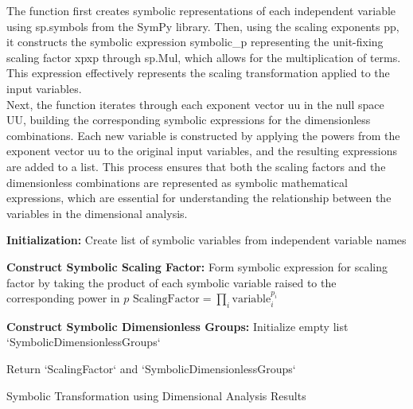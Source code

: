 \documentclass{article}
\begin{document}
The function first creates symbolic representations of each independent variable using sp.symbols from the SymPy library. Then, using the scaling exponents pp, it constructs the symbolic expression symbolic\_p representing the unit-fixing scaling factor xpxp through sp.Mul, which allows for the multiplication of terms. This expression effectively represents the scaling transformation applied to the input variables.\\

Next, the function iterates through each exponent vector uu in the null space UU, building the corresponding symbolic expressions for the dimensionless combinations. Each new variable is constructed by applying the powers from the exponent vector uu to the original input variables, and the resulting expressions are added to a list. This process ensures that both the scaling factors and the dimensionless combinations are represented as symbolic mathematical expressions, which are essential for understanding the relationship between the variables in the dimensional analysis.\\



\begin{algorithm}[H]
\SetAlgoLined
{}

\textbf{Initialization:}\;
Create list of symbolic variables from independent variable names\;

\textbf{Construct Symbolic Scaling Factor:}\;
Form symbolic expression for scaling factor by taking the product of each symbolic variable raised to the corresponding power in \(p\)\;
\( \text{ScalingFactor} = \prod_{i} \text{variable}_i^{p_i} \)\;

\textbf{Construct Symbolic Dimensionless Groups:}\;
Initialize empty list `SymbolicDimensionlessGroups`\;

Return `ScalingFactor` and `SymbolicDimensionlessGroups`\;

\caption{Symbolic Transformation using Dimensional Analysis Results}
\label{alg:symbolic_transformation} %
\end{algorithm}
\end{document}
